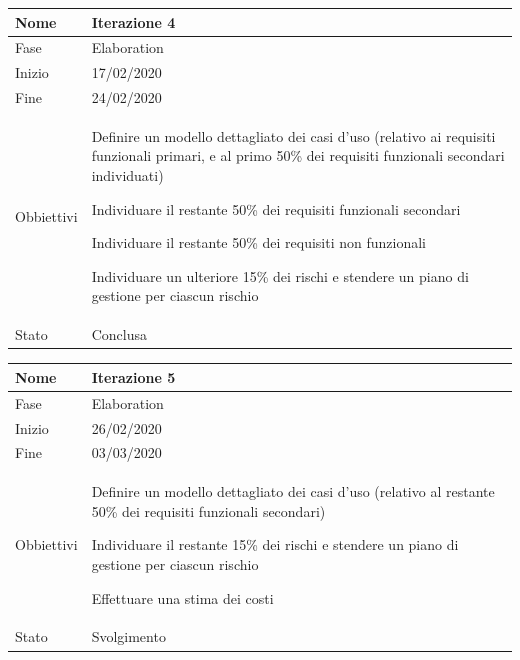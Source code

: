 \begin{center}
\begin{tabular}{ |p{2cm}|p{10cm}|  }
\hline
Nome & Iterazione 4 \\\hline
Fase & Elaboration \\\hline
Inizio & 17/02/2020 \\\hline
Fine &  24/02/2020 \\\hline
Obbiettivi & 
	\begin{compactitem}
		\item Definire un modello dettagliato dei casi d'uso (relativo ai requisiti funzionali primari, e al primo 50\% dei requisiti funzionali secondari individuati) 
		\item Individuare il restante 50\% dei requisiti funzionali secondari
		\item Individuare il restante 50\% dei requisiti non funzionali
		\item Individuare un ulteriore 15\% dei rischi  e stendere un piano di gestione per ciascun rischio
	\end{compactitem}\\\hline
Stato &  Conclusa \\\hline
\end{tabular}
\label{table:4}\newline

\begin{tabular}{ |p{2cm}|p{10cm}|  }
\hline
Nome & Iterazione 5 \\\hline
Fase & Elaboration \\\hline
Inizio & 26/02/2020 \\\hline
Fine &  03/03/2020  \\\hline
Obbiettivi & 
	\begin{compactitem}
		\item Definire un modello dettagliato dei casi d'uso (relativo al restante 50\% dei requisiti funzionali secondari)
		\item Individuare il restante 15\% dei rischi  e stendere un piano di gestione per ciascun rischio
		\item Effettuare una stima dei costi 
	\end{compactitem}\\\hline
Stato &  Svolgimento \\\hline
\end{tabular}
\label{table:5}\newline


\end{center}
